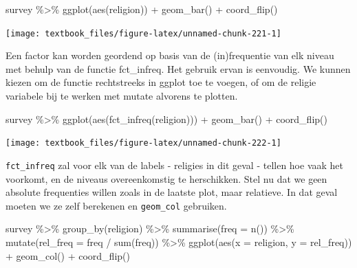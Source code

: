 \documentclass[]{tufte-book}
\newenvironment{Shaded}{}{}
\newcommand{\AttributeTok}[1]{\textcolor[rgb]{0.49,0.56,0.16}{#1}}
\newcommand{\FunctionTok}[1]{\textcolor[rgb]{0.02,0.16,0.49}{#1}}
\newcommand{\NormalTok}[1]{#1}
\newcommand{\SpecialCharTok}[1]{\textcolor[rgb]{0.25,0.44,0.63}{#1}}
\begin{document}
\begin{Shaded}
\begin{Highlighting}[]
\NormalTok{survey }\SpecialCharTok{\%\textgreater{}\%}
  \FunctionTok{ggplot}\NormalTok{(}\FunctionTok{aes}\NormalTok{(religion)) }\SpecialCharTok{+}
  \FunctionTok{geom\_bar}\NormalTok{() }\SpecialCharTok{+}
  \FunctionTok{coord\_flip}\NormalTok{()}
\end{Highlighting}
\end{Shaded}

\texttt{[image: textbook\_files/figure-latex/unnamed-chunk-221-1]}

Een factor kan worden geordend op basis van de (in)frequentie van elk niveau met behulp van de functie fct\_infreq. Het gebruik ervan is eenvoudig. We kunnen kiezen om de functie rechtstreeks in ggplot toe te voegen, of om de religie variabele bij te werken met mutate alvorens te plotten.

\begin{Shaded}
\begin{Highlighting}[]
\NormalTok{survey }\SpecialCharTok{\%\textgreater{}\%}
  \FunctionTok{ggplot}\NormalTok{(}\FunctionTok{aes}\NormalTok{(}\FunctionTok{fct\_infreq}\NormalTok{(religion))) }\SpecialCharTok{+}
  \FunctionTok{geom\_bar}\NormalTok{() }\SpecialCharTok{+}
  \FunctionTok{coord\_flip}\NormalTok{()}
\end{Highlighting}
\end{Shaded}

\texttt{[image: textbook\_files/figure-latex/unnamed-chunk-222-1]}

\texttt{fct\_infreq} zal voor elk van de labels - religies in dit geval - tellen hoe vaak het voorkomt, en de niveaus overeenkomstig te herschikken. Stel nu dat we geen absolute frequenties willen zoals in de laatste plot, maar relatieve. In dat geval moeten we ze zelf berekenen en \texttt{geom\_col} gebruiken.

\begin{Shaded}
\begin{Highlighting}[]
\NormalTok{survey }\SpecialCharTok{\%\textgreater{}\%}
  \FunctionTok{group\_by}\NormalTok{(religion) }\SpecialCharTok{\%\textgreater{}\%}
  \FunctionTok{summarise}\NormalTok{(}\AttributeTok{freq =} \FunctionTok{n}\NormalTok{()) }\SpecialCharTok{\%\textgreater{}\%}
  \FunctionTok{mutate}\NormalTok{(}\AttributeTok{rel\_freq =}\NormalTok{ freq }\SpecialCharTok{/} \FunctionTok{sum}\NormalTok{(freq)) }\SpecialCharTok{\%\textgreater{}\%}
  \FunctionTok{ggplot}\NormalTok{(}\FunctionTok{aes}\NormalTok{(}\AttributeTok{x =}\NormalTok{ religion, }\AttributeTok{y =}\NormalTok{ rel\_freq)) }\SpecialCharTok{+}
  \FunctionTok{geom\_col}\NormalTok{() }\SpecialCharTok{+}
  \FunctionTok{coord\_flip}\NormalTok{()}
\end{Highlighting}
\end{Shaded}
\end{document}
